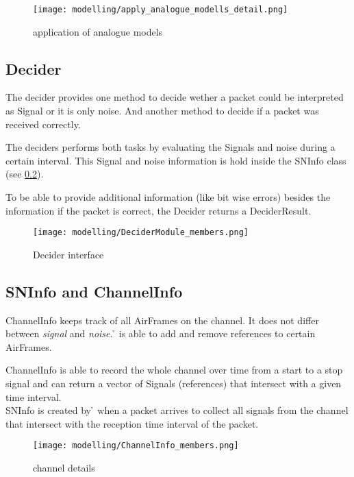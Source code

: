 \begin{figure}[H]
 \centering
 \texttt{[image: modelling/apply\_analogue\_modells\_detail.png]}
 \caption{application of analogue models}
 \label{fig: application analogue models}
\end{figure}
\newpage

\subsection{Decider}

The decider provides one method to decide wether a packet could be interpreted as Signal or it is only noise. And another method to decide if a packet was received correctly.

The deciders performs both tasks by evaluating the Signals and noise during a certain interval. This Signal and noise information is hold inside the SNInfo class (see  \ref{SNInfoModelling}).

To be able to provide additional information (like bit wise errors) besides the information if the packet is correct, the Decider returns a DeciderResult.

\begin{figure}[H]
 \centering
 \texttt{[image: modelling/DeciderModule\_members.png]}
 \caption{Decider interface}
 \label{fig: Decider interface}
\end{figure}
\newpage

\subsection{SNInfo and ChannelInfo}
\label{SNInfoModelling}

ChannelInfo keeps track of all AirFrames on the channel. It does not differ between \textit{signal} and \textit{noise}. \h{\basePhyLayer} is able to
add and remove references to certain AirFrames.

ChannelInfo is able to record the whole channel over time from a start to a stop signal and can return a vector of Signals (references) that intersect with a given time interval.\\
SNInfo is created by \h{\basePhyLayer} when a packet arrives to collect all signals from the channel that intersect with the reception time interval of the packet.

\begin{figure}[H]
 \centering
 \texttt{[image: modelling/ChannelInfo\_members.png]}
 \caption{channel details}
 \label{fig: channel details}
\end{figure}

